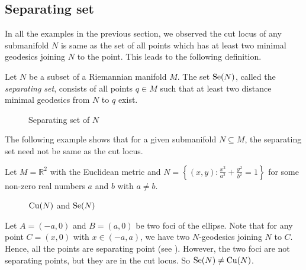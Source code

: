 \subsection{Separating set}\label{subsec:separatingSet}
\hfb In all the examples in the previous section, we observed the cut locus of any submanifold $N$ is same as the set of all points which has at least two minimal geodesics joining $N$ to the point. This leads to the following definition.

\begin{defn}\label{defn:SeparatingSet}
    Let $N$ be a subset of a Riemannian manifold $M$. The set $\mathrm{Se}(N)$, called the \textit{separating set}, consists of all points $q\in M$ such that at least two distance minimal geodesics from $N$ to $q$ exist.
\end{defn}
\begin{figure}[!htpb]
    \centering
    \caption{Separating set of $N$ \label{fig:SeparatingSet}}
\end{figure}

\vspace{0.3cm}
\hf The following example shows that for a given submanifold $N\subseteq M$, the separating set need not be same as the cut locus.

\begin{eg}\label{eg:CutLocusOfEllipse}
    Let $M=\mathbb{R}^2$ with the Euclidean metric and $N= \left\{(x,y):\frac{x^2}{a^2}+\frac{y^2}{b^2}=1\right\}$ for some non-zero real numbers $a$ and $b$ with $a\neq b$.
    \begin{figure}[!htb]
        \centering
        \caption{$\mathrm{Cu}(N)$ and $\mathrm{Se}(N)$ \label{fig:Example-CutLocusEllipse}}
    \end{figure}
    Let $A=(-a,0)$ and $B=(a,0)$ be two foci of the ellipse. Note that for any point $C=(x,0)$ with $x\in (-a,a)$, we have two $N$-geodesics joining $N$ to $C$. Hence, all the points are separating point (see ). However, the two foci are not separating points, but they are in the cut locus. So $\mathrm{Se}(N) \neq \mathrm{Cu}(N)$. 
\end{eg}

